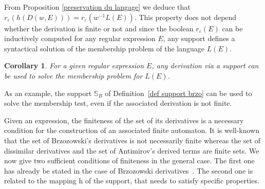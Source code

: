 \documentclass{article}
\newtheorem{corollary}{Corollary}
\begin{document}
From Proposition \ref{preservation du langage} we deduce that $r_{\varepsilon}(h(D(w,E)))=r_{\varepsilon}(w^{-1}L(E))$. This property does not depend whether the derivation is finite or not
and since the boolean $r_{\varepsilon}(E)$ can be inductively computed for any regular expression $E$, any support defines a syntactical solution of the membership problem of the language $L(E)$.

  \begin{corollary}
    For a given regular expression $E$, any derivation via a support can be used to solve the membership problem for $L(E)$.
  \end{corollary}
  
As an example, the support $\mathbb{S}_B$ of Definition~\ref{def support brzo} can be used to solve the membership test, even if the associated derivation is not finite. 
  
Given an expression, the finiteness of the set of its derivatives
is a necessary condition for the construction of an associated finite automaton.
It is well-known that the set of Brzozowski's derivatives is not necessarily finite whereas the set of
dissimilar derivatives
and the set of 
Antimirov's derived
terms are finite sets.
We now give two sufficient conditions of finiteness in the general case. The first one has already be stated in the case of Brzozowski derivatives~\cite{Brz64}. The second one is related to the mapping $\mathrm{h}$ of the support, that needs to satisfy specific properties. 
\end{document}
